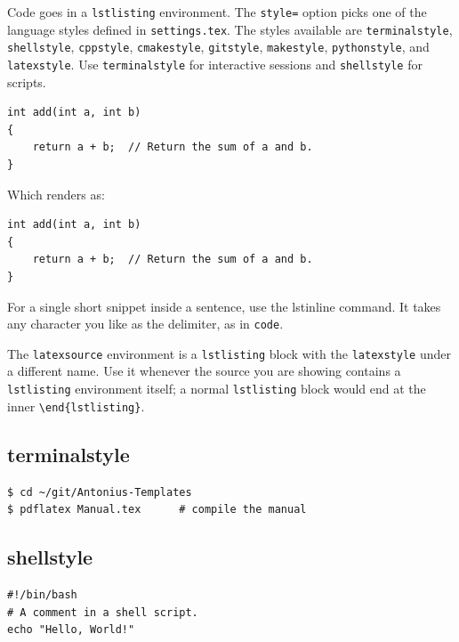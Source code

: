 Code goes in a \texttt{lstlisting} environment. The \texttt{style=} option picks one of the language styles defined in \texttt{settings.tex}. The styles available are \texttt{terminalstyle}, \texttt{shellstyle}, \texttt{cppstyle}, \texttt{cmakestyle}, \texttt{gitstyle}, \texttt{makestyle}, \texttt{pythonstyle}, and \texttt{latexstyle}. Use \texttt{terminalstyle} for interactive sessions and \texttt{shellstyle} for scripts.

\begin{latexsource}
\begin{lstlisting}[style=cppstyle]
int add(int a, int b)
{
	return a + b;  // Return the sum of a and b.
}
\end{lstlisting}
\end{latexsource}

Which renders as:

\begin{lstlisting}[style=cppstyle]
int add(int a, int b)
{
	return a + b;  // Return the sum of a and b.
}
\end{lstlisting}

For a single short snippet inside a sentence, use the lstinline command. It takes any character you like as the delimiter, as in \texttt{\string\lstinline|code|}.

The \texttt{latexsource} environment is a \texttt{lstlisting} block with the \texttt{latexstyle} under a different name. Use it whenever the source you are showing contains a \texttt{lstlisting} environment itself; a normal \texttt{lstlisting} block would end at the inner \lstinline|\end{lstlisting}|.

\subsection{terminalstyle}

\begin{lstlisting}[style=terminalstyle]
$ cd ~/git/Antonius-Templates
$ pdflatex Manual.tex      # compile the manual
\end{lstlisting}

\subsection{shellstyle}

\begin{lstlisting}[style=shellstyle]
#!/bin/bash
# A comment in a shell script.
echo "Hello, World!"
\end{lstlisting}

